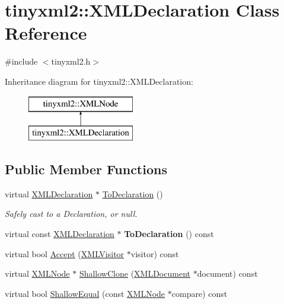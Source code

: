 \hypertarget{classtinyxml2_1_1XMLDeclaration}{}\section{tinyxml2\+::X\+M\+L\+Declaration Class Reference}
\label{classtinyxml2_1_1XMLDeclaration}


{\ttfamily \#include $<$tinyxml2.\+h$>$}

Inheritance diagram for tinyxml2\+::X\+M\+L\+Declaration\+:\begin{figure}[H]
\begin{center}
\leavevmode
\includegraphics[height=2.000000cm]{classtinyxml2_1_1XMLDeclaration}
\end{center}
\end{figure}
\subsection*{Public Member Functions}
\begin{DoxyCompactItemize}
\item 
\mbox{\label{classtinyxml2_1_1XMLDeclaration_a159d8ac45865215e88059ea1e5b52fc5}} 
virtual \mbox{\hyperlink{classtinyxml2_1_1XMLDeclaration}{X\+M\+L\+Declaration}} $\ast$ \mbox{\hyperlink{classtinyxml2_1_1XMLDeclaration_a159d8ac45865215e88059ea1e5b52fc5}{To\+Declaration}} ()
\begin{DoxyCompactList}\small\item\em Safely cast to a Declaration, or null. \end{DoxyCompactList}\item 
\mbox{\label{classtinyxml2_1_1XMLDeclaration_aa20c3315b18c3b88830dccf5c493259b}} 
virtual const \mbox{\hyperlink{classtinyxml2_1_1XMLDeclaration}{X\+M\+L\+Declaration}} $\ast$ {\bfseries To\+Declaration} () const
\item 
virtual bool \mbox{\hyperlink{classtinyxml2_1_1XMLDeclaration_a5f376019fb34752eb248548f42f32045}{Accept}} (\mbox{\hyperlink{classtinyxml2_1_1XMLVisitor}{X\+M\+L\+Visitor}} $\ast$visitor) const
\item 
virtual \mbox{\hyperlink{classtinyxml2_1_1XMLNode}{X\+M\+L\+Node}} $\ast$ \mbox{\hyperlink{classtinyxml2_1_1XMLDeclaration_a118d47518dd9e522644e42efa259aed7}{Shallow\+Clone}} (\mbox{\hyperlink{classtinyxml2_1_1XMLDocument}{X\+M\+L\+Document}} $\ast$document) const
\item 
virtual bool \mbox{\hyperlink{classtinyxml2_1_1XMLDeclaration_aa26b70011694e9b9e9480b929e9b78d6}{Shallow\+Equal}} (const \mbox{\hyperlink{classtinyxml2_1_1XMLNode}{X\+M\+L\+Node}} $\ast$compare) const
\end{DoxyCompactItemize}
